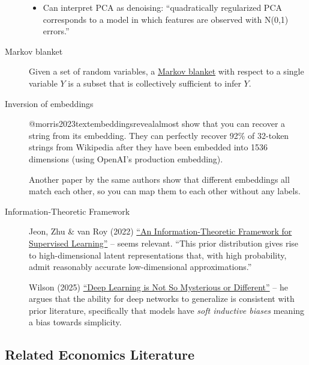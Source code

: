 \documentclass[
  10pt,
  letterpaper,
  DIV=11,
  numbers=noendperiod,
  oneside]{scrartcl}
\providecommand{\tightlist}{%
  \setlength{\itemsep}{0pt}\setlength{\parskip}{0pt}}\usepackage{longtable,booktabs,array}
\begin{document}
\begin{description}
\begin{itemize}
\tightlist
\item
  Can interpret PCA as denoising: ``quadratically regularized PCA
  corresponds to a model in which features are observed with N(0,1)
  errors.''
\end{itemize}
\item[Markov blanket]
Given a set of random variables, a
\href{https://en.wikipedia.org/wiki/Markov_blanket}{Markov blanket} with
respect to a single variable \(Y\) is a subset that is collectively
sufficient to infer \(Y\).
\item[Inversion of embeddings]
@morris2023textembeddingsrevealalmost show that you can recover a string
from its embedding. They can perfectly recover 92\% of 32-token strings
from Wikipedia after they have been embedded into 1536 dimensions (using
OpenAI's production embedding).

Another paper by the same authors show that different embeddings all
match each other, so you can map them to each other without any labels.
\item[Information-Theoretic Framework]
Jeon, Zhu \& van Roy (2022) \href{https://arxiv.org/pdf/2203.00246}{``An
Information-Theoretic Framework for Supervised Learning''} -- seems
relevant. ``This prior distribution gives rise to high-dimensional
latent representations that, with high probability, admit reasonably
accurate low-dimensional approximations.''

Wilson (2025) \href{https://arxiv.org/pdf/2503.02113}{``Deep Learning is
Not So Mysterious or Different''} -- he argues that the ability for deep
networks to generalize is consistent with prior literature, specifically
that models have \emph{soft inductive biases} meaning a bias towards
simplicity.
\end{description}

\subsection{Related Economics
Literature}\label{related-economics-literature}
\end{document}

